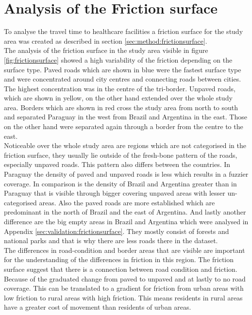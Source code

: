 \documentclass[11pt, a4paper]{report}
\begin{document}
\section{Analysis of the Friction surface}\label{sec:results:frictionsurface}
To analyse the travel time to healthcare facilities a friction surface for the study area was created as described in section \ref{sec:method:frictionsurface}. \\
%
The analysis of the friction surface in the study area visible in figure \ref{fig:frictionsurface} showed a high variability of the friction depending on the surface type. Paved roads which are shown in blue were the fastest surface type and were concentrated around city centres and connecting roads between cities. The highest concentration was in the centre of the tri-border. Unpaved roads, which are shown in yellow, on the other hand extended over the whole study area. Borders which are shown in red cross the study area from north to south and separated Paraguay in the west from Brazil and Argentina in the east. Those on the other hand were separated again through a border from the centre to the east. \\
%
Noticeable over the whole study area are regions which are not categorised in the friction surface, they usually lie outside of the fresh-bone pattern of the roads, especially unpaved roads. This pattern also differs between the countries. In Paraguay the density of paved and unpaved roads is less which results in a fuzzier coverage. In comparison is the density of Brazil and Argentina greater than in Paraguay that is visible through bigger covering unpaved areas with lesser un-categorised areas. Also the paved roads are more established which are predominant in the north of Brazil and the east of Argentina. And lastly another difference are the big empty areas in Brazil and Argentina which were analysed in Appendix \ref{sec:validation:frictionsurface}. They mostly consist of forests and national parks and that is why there are less roads there in the dataset.\\
%
The differences in road-condition and border areas that are visible are important for the understanding of the differences in friction in this region. The friction surface suggest that there is a connection between road condition and friction. Because of the graduated change from paved to unpaved and at lastly to no road coverage. This can be translated to a gradient for friction from urban areas with low friction to rural areas with high friction. This means residents in rural areas have a greater cost of movement than residents of urban areas. 
\end{document}
